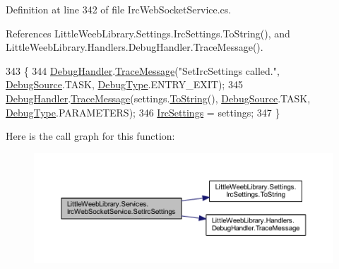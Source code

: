 Definition at line 342 of file Irc\+Web\+Socket\+Service.\+cs.



References Little\+Weeb\+Library.\+Settings.\+Irc\+Settings.\+To\+String(), and Little\+Weeb\+Library.\+Handlers.\+Debug\+Handler.\+Trace\+Message().


\begin{DoxyCode}
343         \{
344             \mbox{\hyperlink{class_little_weeb_library_1_1_handlers_1_1_debug_handler}{DebugHandler}}.\mbox{\hyperlink{class_little_weeb_library_1_1_handlers_1_1_debug_handler_afccb37dfd6b2114af72000c2f4fe4607}{TraceMessage}}(\textcolor{stringliteral}{"SetIrcSettings called."}, 
      \mbox{\hyperlink{namespace_little_weeb_library_1_1_handlers_a2a6ca0775121c9c503d58aa254d292be}{DebugSource}}.TASK, \mbox{\hyperlink{namespace_little_weeb_library_1_1_handlers_ab66019ed40462876ec4e61bb3ccb0a62}{DebugType}}.ENTRY\_EXIT);
345             \mbox{\hyperlink{class_little_weeb_library_1_1_handlers_1_1_debug_handler}{DebugHandler}}.\mbox{\hyperlink{class_little_weeb_library_1_1_handlers_1_1_debug_handler_afccb37dfd6b2114af72000c2f4fe4607}{TraceMessage}}(settings.\mbox{\hyperlink{class_little_weeb_library_1_1_settings_1_1_irc_settings_a2e1d7f26d7d3083d19c3a9e6c6c2d0b2}{ToString}}(), 
      \mbox{\hyperlink{namespace_little_weeb_library_1_1_handlers_a2a6ca0775121c9c503d58aa254d292be}{DebugSource}}.TASK, \mbox{\hyperlink{namespace_little_weeb_library_1_1_handlers_ab66019ed40462876ec4e61bb3ccb0a62}{DebugType}}.PARAMETERS);
346             \mbox{\hyperlink{class_little_weeb_library_1_1_settings_1_1_irc_settings}{IrcSettings}} = settings;
347         \}
\end{DoxyCode}
Here is the call graph for this function\+:\nopagebreak
\begin{figure}[H]
\begin{center}
\leavevmode
\includegraphics[width=350pt]{class_little_weeb_library_1_1_services_1_1_irc_web_socket_service_a6476ee44ddf292f916b20085c03af5eb_cgraph}
\end{center}
\end{figure}
\mbox{\label{class_little_weeb_library_1_1_services_1_1_irc_web_socket_service_a48697b5d89c2899e73d1ecf7492bd083}} 
